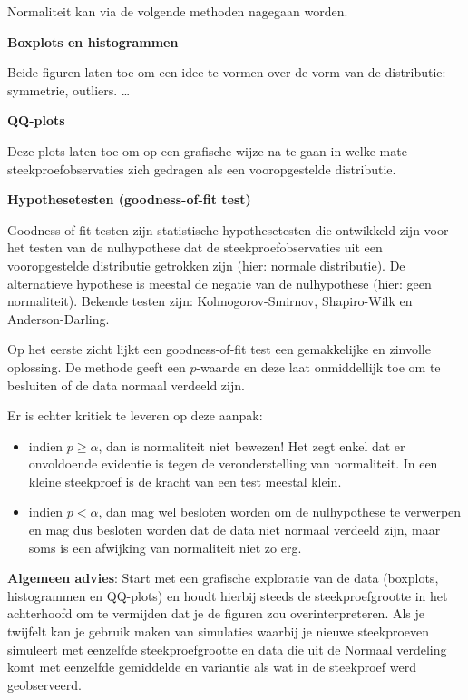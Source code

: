 \documentclass[
  dutch,
  letterpaper,
  12pt]{book}
\providecommand{\tightlist}{%
  \setlength{\itemsep}{0pt}\setlength{\parskip}{0pt}}
\theoremstyle{definition}
\theoremstyle{definition}
\theoremstyle{definition}
\theoremstyle{remark}
\begin{document}
Normaliteit kan via de volgende methoden nagegaan worden.

\textbf{Boxplots en histogrammen}

Beide figuren laten toe om een idee te vormen over de vorm van de
distributie: symmetrie, outliers. \ldots

\textbf{QQ-plots}

Deze plots laten toe om op een grafische wijze na te gaan in welke mate
steekproefobservaties zich gedragen als een vooropgestelde distributie.

\textbf{Hypothesetesten (goodness-of-fit test)}

Goodness-of-fit testen zijn statistische hypothesetesten die ontwikkeld
zijn voor het testen van de nulhypothese dat de steekproefobservaties
uit een vooropgestelde distributie getrokken zijn (hier: normale
distributie). De alternatieve hypothese is meestal de negatie van de
nulhypothese (hier: geen normaliteit). Bekende testen zijn:
Kolmogorov-Smirnov, Shapiro-Wilk en Anderson-Darling.

Op het eerste zicht lijkt een goodness-of-fit test een gemakkelijke en
zinvolle oplossing. De methode geeft een \(p\)-waarde en deze laat
onmiddellijk toe om te besluiten of de data normaal verdeeld zijn.

Er is echter kritiek te leveren op deze aanpak:

\begin{itemize}
\tightlist
\item
  indien \(p\geq \alpha\), dan is normaliteit niet bewezen! Het zegt
  enkel dat er onvoldoende evidentie is tegen de veronderstelling van
  normaliteit. In een kleine steekproef is de kracht van een test
  meestal klein.
\item
  indien \(p<\alpha\), dan mag wel besloten worden om de nulhypothese te
  verwerpen en mag dus besloten worden dat de data niet normaal verdeeld
  zijn, maar soms is een afwijking van normaliteit niet zo erg.
\end{itemize}

\textbf{Algemeen advies}: Start met een grafische exploratie van de data
(boxplots, histogrammen en QQ-plots) en houdt hierbij steeds de
steekproefgrootte in het achterhoofd om te vermijden dat je de figuren
zou overinterpreteren. Als je twijfelt kan je gebruik maken van
simulaties waarbij je nieuwe steekproeven simuleert met eenzelfde
steekproefgrootte en data die uit de Normaal verdeling komt met
eenzelfde gemiddelde en variantie als wat in de steekproef werd
geobserveerd.
\end{document}
